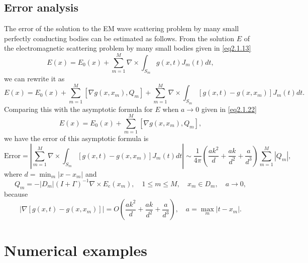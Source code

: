 \documentclass[12pt]{article}
\numberwithin{equation}{section}
\newcommand{\be}{\begin{equation}}
\newcommand{\ee}{\end{equation}}
\begin{document}
\subsection{Error analysis}
The error of the solution to the EM wave scattering problem by many small perfectly conducting bodies can be estimated as follows. From the solution $E$ of the electromagnetic scattering problem by many small bodies given in \eqref{eq2.1.13}
\be \label{eq3.5.48}
    E(x)=E_0(x)+\sum_{m=1}^M \nabla\times \int_{S_m} g(x,t) J_m(t)dt,
\ee
we can rewrite it as
\be \label{eq3.5.49}
    E(x)=E_0(x)+\sum_{m=1}^M [\nabla g(x,x_m), Q_m]+\sum_{m=1}^M \nabla\times \int_{S_m} [g(x,t)-g(x,x_m)] J_m(t)dt.
\ee
Comparing this with the asymptotic formula for $E$ when $a \to 0$ given in \eqref{eq2.1.22}
\be \label{eq3.5.50}
    E(x)=E_0(x)+\sum_{m=1}^M [\nabla g(x,x_m), Q_m],
\ee
we have the error of this asymptotic formula is
\be \label{eq3.5.51}
    \text{Error}=\left|\sum_{m=1}^M \nabla\times \int_{S_m} [g(x,t)-g(x,x_m)] J_m(t)dt\right| \sim \frac{1}{4\pi}\left(\frac{ak^2}{d}+\frac{ak}{d^2}+\frac{a}{d^3}\right)\sum_{m=1}^M|Q_m|,
\ee
where $d=\min_m|x-x_m|$ and
\be \label{eq3.5.52}
    Q_m=-|D_m|(I+\Gamma)^{-1} \nabla\times E_{e}(x_m), \quad 1 \le m \le M, \quad x_m \in D_m, \quad a \to 0,
\ee
because
\be \label{eq3.5.53}
    |\nabla[g(x,t)-g(x,x_m)]| = O\left(\frac{ak^2}{d}+\frac{ak}{d^2}+\frac{a}{d^3}\right), \quad a=\max_m|t-x_m|.
\ee

\section{Numerical examples} \label{sec3}
\end{document}
